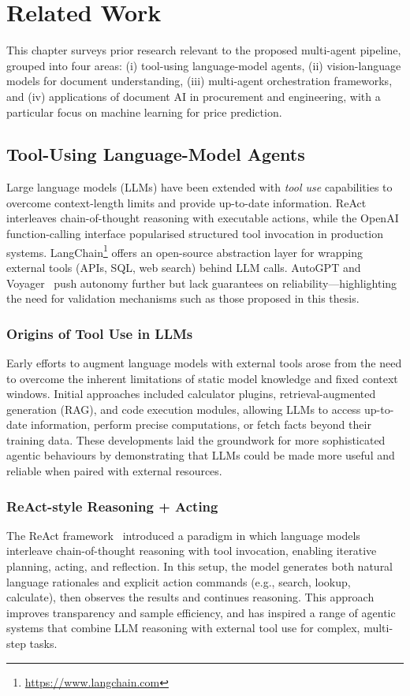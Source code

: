 \chapter{Related Work}\label{chapter:relatedwork}

This chapter surveys prior research relevant to the proposed multi-agent pipeline, grouped into four areas: (i) tool-using language-model agents, (ii) vision-language models for document understanding, (iii) multi-agent orchestration frameworks, and (iv) applications of document AI in procurement and engineering, with a particular focus on machine learning for price prediction.

\section{Tool-Using Language-Model Agents}
Large language models (LLMs) have been extended with \emph{tool use} capabilities to overcome context-length limits and provide up-to-date information.  
ReAct~\cite{yao2023react} interleaves chain-of-thought reasoning with executable actions, while the OpenAI function-calling interface popularised structured tool invocation in production systems.  
LangChain\footnote{\url{https://www.langchain.com}} offers an open-source abstraction layer for wrapping external tools (APIs, SQL, web search) behind LLM calls.  
AutoGPT and Voyager~\cite{wang2023voyager} push autonomy further but lack guarantees on reliability—highlighting the need for validation mechanisms such as those proposed in this thesis.

\subsection{Origins of Tool Use in LLMs}
Early efforts to augment language models with external tools arose from the need to overcome the inherent limitations of static model knowledge and fixed context windows. Initial approaches included calculator plugins, retrieval-augmented generation (RAG), and code execution modules, allowing LLMs to access up-to-date information, perform precise computations, or fetch facts beyond their training data. These developments laid the groundwork for more sophisticated agentic behaviours by demonstrating that LLMs could be made more useful and reliable when paired with external resources.

\subsection{ReAct-style Reasoning + Acting}
The ReAct framework~\cite{yao2023react} introduced a paradigm in which language models interleave chain-of-thought reasoning with tool invocation, enabling iterative planning, acting, and reflection. In this setup, the model generates both natural language rationales and explicit action commands (e.g., search, lookup, calculate), then observes the results and continues reasoning. This approach improves transparency and sample efficiency, and has inspired a range of agentic systems that combine LLM reasoning with external tool use for complex, multi-step tasks.

